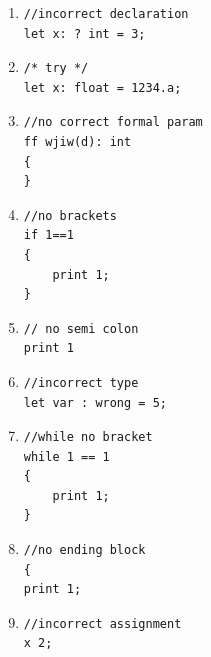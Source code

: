 \documentclass{article}
\begin{document}
				\begin{enumerate}
				\item 
				\begin{lstlisting}[backgroundcolor=\color{lightgray}]
//incorrect declaration
let x: ? int = 3;
				\end{lstlisting}
				
				\item 
				\begin{lstlisting}[backgroundcolor=\color{lightgray}]
/* try */
let x: float = 1234.a;
				\end{lstlisting}
				
				\item 
				\begin{lstlisting}[backgroundcolor=\color{lightgray}]
//no correct formal param
ff wjiw(d): int
{
}
				\end{lstlisting}
				
				\item 
				\begin{lstlisting}[backgroundcolor=\color{lightgray}]
//no brackets
if 1==1
{
	print 1;
}
				\end{lstlisting}
				
				\item 
				\begin{lstlisting}[backgroundcolor=\color{lightgray}]
// no semi colon
print 1
				\end{lstlisting}
				
				\item 
				\begin{lstlisting}[backgroundcolor=\color{lightgray}]
//incorrect type
let var : wrong = 5;
				\end{lstlisting}
				
				\item 
				\begin{lstlisting}[backgroundcolor=\color{lightgray}]
//while no bracket
while 1 == 1
{
	print 1;
}
				\end{lstlisting}
				
				\item 
				\begin{lstlisting}[backgroundcolor=\color{lightgray}]
//no ending block
{
print 1;
				\end{lstlisting}
				
				\item 
				\begin{lstlisting}[backgroundcolor=\color{lightgray}]
//incorrect assignment
x 2;
				\end{lstlisting}
				

\end{enumerate}
\end{document}

